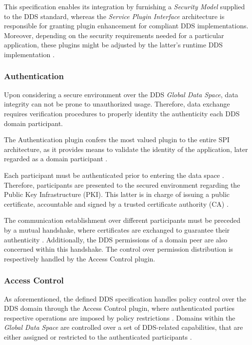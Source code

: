 This specification enables its integration by furnishing a \textit{Security Model} supplied to the DDS standard, whereas the \textit{Service Plugin Interface} architecture is responsible for granting plugin enhancement for compliant DDS implementations. Moreover, depending on the security requirements needed for a particular application, these plugins might be adjusted by the latter's runtime DDS implementation \cite{dds-s}.

\subsubsection{Authentication}

Upon considering a secure environment over the DDS \textit{Global Data Space}, data integrity can not be prone to unauthorized usage. Therefore, data exchange requires verification procedures to properly identity the authenticity each DDS domain participant.

The Authentication plugin confers the most valued plugin to the entire SPI architecture, as it provides means to validate the identity of the application, later regarded as a domain participant \cite{dds-s, ros-dds-integration}. 

Each participant must be authenticated prior to entering the data space \cite{white2019network}. Therefore, participants are presented to the secured environment regarding the Public Key Infrastructure (PKI). This latter is in charge of issuing a public certificate, accountable and signed by a trusted certificate authority (CA) \cite{white2019network, white2016sros, ros-dds-integration}. 

The communication establishment over different participants must be preceded by a mutual handshake, where certificates are exchanged to guarantee their authenticity \cite{white2019network, kim2018security}. Additionally, the DDS permissions of a domain peer are also concerned within this handshake. The control over permission distribution is respectively handled by the Access Control plugin.

\subsubsection{Access Control}

As aforementioned, the defined DDS specification handles policy control over the DDS domain through the Access Control plugin, where authenticated parties respective operations are imposed by policy restrictions \cite{dds-s, white2019network}. Domains within the \textit{Global Data Space} are controlled over a set of DDS-related capabilities, that are either assigned or restricted to the authenticated participants \cite{ros-dds-integration}. 

